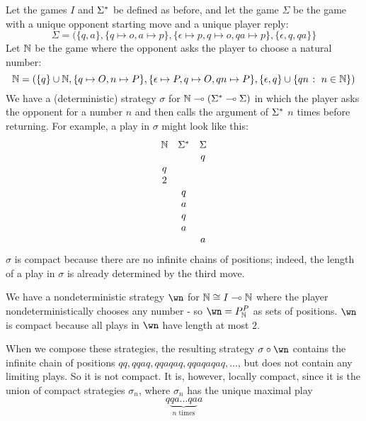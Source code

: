 \documentclass{article}
\begin{document}
\begin{example}
  Let the games $I$ and ${\Sigma^*}$ be defined as before, and let the game $\Sigma$ be the game with a unique opponent starting move and a unique player reply:
  \[
    \Sigma = (\{q,a\}, \{q\mapsto o, a\mapsto p\}, \{\epsilon\mapsto p,q\mapsto o,qa\mapsto p\}, \{\epsilon, q, qa\}\}
    \]
  Let $\mathbb{N}$ be the game where the opponent asks the player to choose a natural number:
  \[
    \mathbb{N} = \left(\{q\} \cup \mathbb{N}, \{q\mapsto O, n\mapsto P\}, \{\epsilon\mapsto P,q\mapsto O,qn\mapsto P\}, \{\epsilon, q\} \cup \{qn\;\colon\; n\in\mathbb{N}\}\right)
    \]
  We have a (deterministic) strategy $\sigma$ for $\mathbb{N}\multimap ({\Sigma^*}\multimap\Sigma)$ in which the player asks the opponent for a number $n$ and then calls the argument of ${\Sigma^*}$ $n$ times before returning.  For example, a play in $\sigma$ might look like this:
  \[
    \begin{array}{ccc}
      \mathbb{N} & {\Sigma^*} & \Sigma \\
      & & q \\
      q & & \\
      2 & & \\
      & q & \\
      & a & \\
      & q & \\
      & a & \\
      & & a
    \end{array}
    \]
  $\sigma$ is compact because there are no infinite chains of positions; indeed, the length of a play in $\sigma$ is already determined by the third move.  

  We have a nondeterministic strategy $\wn$ for $\mathbb{N}\cong I\multimap\mathbb{N}$ where the player nondeterministically chooses any number - so $\wn = P_{\bN}^P$ as sets of positions.  $\wn$ is compact because all plays in $\wn$ have length at most $2$.  

  When we compose these strategies, the resulting strategy $\comp\sigma\wn$ contains the infinite chain of positions $qq,qqaq,qqaqaq,qqaqaqaq,\dots$, but does not contain any limiting plays.  So it is not compact.  It is, however, locally compact, since it is the union of compact strategies $\sigma_n$, where $\sigma_n$ has the unique maximal play
  \[
    q\underbrace{qa\dots qa}_{\textrm{$n$ times}}a
    \]
\end{example}
\end{document}
